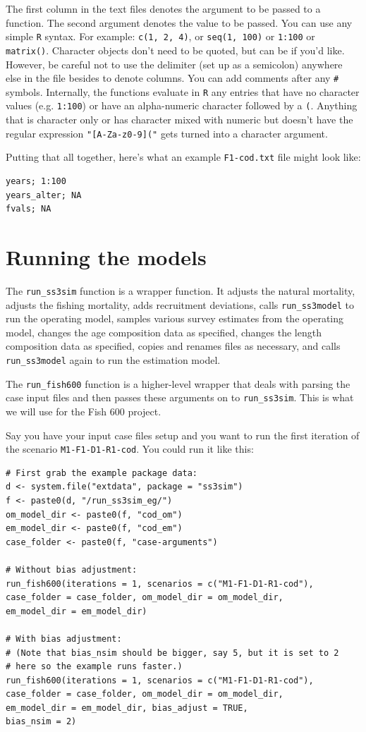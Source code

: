 \documentclass[12pt]{article}
\begin{document}
The first column in the text files denotes the argument to be passed to a 
function. The second argument denotes the value to be passed. You can use any 
simple \texttt{R} syntax. For example: \texttt{c(1, 2, 4)}, or \texttt{seq(1, 100)} or 
\texttt{1:100} or \texttt{matrix()}. Character objects don't need to be quoted, 
but can be if you'd like. However, be careful not to use the delimiter (set up 
as a semicolon) anywhere else in the file besides to denote columns. You can 
add comments after any \texttt{\#} symbols. Internally, the functions evaluate 
in \texttt{R} any entries that have no character values (e.g. \texttt{1:100}) or have an 
alpha-numeric character followed by a \texttt{(}. Anything that is character 
only or has character mixed with numeric but doesn't have the regular 
expression \texttt{"[A-Za-z0-9]("} gets turned into a character argument.

Putting that all together, here's what an example \texttt{F1-cod.txt} file 
might look like:

\begin{verbatim}
years; 1:100
years_alter; NA 
fvals; NA
\end{verbatim}

\section{Running the models}

The \texttt{run\_ss3sim} function is a wrapper function. It adjusts the natural 
mortality, adjusts the fishing mortality, adds recruitment deviations, calls 
\texttt{run\_ss3model} to run the operating model, samples various survey 
estimates from the operating model, changes the age composition data as 
specified, changes the length composition data as specified, copies and renames 
files as necessary, and calls \texttt{run\_ss3model} again to run the 
estimation model.

The \texttt{run\_fish600} function is a higher-level wrapper that deals with 
parsing the case input files and then passes these arguments on to 
\texttt{run\_ss3sim}. This is what we will use for the Fish 600 project.

Say you have your input case files setup and you want to run the first 
iteration of the scenario \texttt{M1-F1-D1-R1-cod}. You could run it like this:

\begin{verbatim}
# First grab the example package data:
d <- system.file("extdata", package = "ss3sim")
f <- paste0(d, "/run_ss3sim_eg/")
om_model_dir <- paste0(f, "cod_om")
em_model_dir <- paste0(f, "cod_em")
case_folder <- paste0(f, "case-arguments")

# Without bias adjustment:
run_fish600(iterations = 1, scenarios = c("M1-F1-D1-R1-cod"),
case_folder = case_folder, om_model_dir = om_model_dir,
em_model_dir = em_model_dir)

# With bias adjustment:
# (Note that bias_nsim should be bigger, say 5, but it is set to 2
# here so the example runs faster.)
run_fish600(iterations = 1, scenarios = c("M1-F1-D1-R1-cod"),
case_folder = case_folder, om_model_dir = om_model_dir,
em_model_dir = em_model_dir, bias_adjust = TRUE,
bias_nsim = 2)
\end{verbatim}
\end{document}
